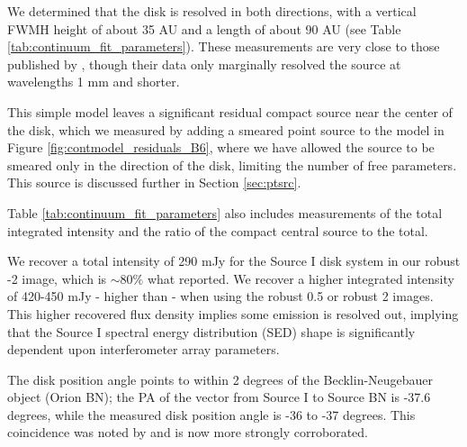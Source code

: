 \documentclass[twocolumn]{aastex61}
\begin{document}
We determined that the disk is resolved in both
directions, with a vertical FWMH height of about 35 AU and a length of about
90 AU (see Table \ref{tab:continuum_fit_parameters}).  These measurements
are very close to those published by \citet{Plambeck2016a}, though their data
only marginally resolved the source at wavelengths 1 mm and shorter.

This simple model leaves a significant residual compact source near
the center of the disk, which we measured by adding a smeared point
source to the model in Figure \ref{fig:contmodel_residuals_B6},
where we have allowed the source to be smeared only in the direction
of the disk, limiting the number of free parameters.
This source is discussed further in Section \ref{sec:ptsrc}.

Table \ref{tab:continuum_fit_parameters} also includes measurements of the
total integrated intensity and the ratio of the compact central source to
the total.

We recover a total intensity of 290 mJy for the Source I disk
system in our robust -2 image, which is  $\sim80\%$ what
\citet{Plambeck2016a} reported.  We recover a higher integrated intensity of
420-450 mJy - higher than \citet{Plambeck2016a} - when using the robust 0.5 
or robust 2 images.  This higher recovered flux density implies some emission
is resolved out, implying that the Source I spectral energy distribution (SED)
shape is significantly dependent upon interferometer array parameters.



The disk position angle points to within 2 degrees of the Becklin-Neugebauer
object (Orion BN); the PA of the vector from Source I to Source BN is -37.6
degrees, while the measured disk position angle is -36 to -37 degrees.
This coincidence was noted by \citet{Bally2011a} and is now more strongly
corroborated.

\end{document}
